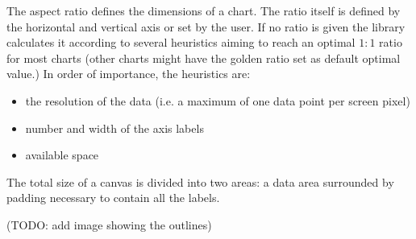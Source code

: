 The aspect ratio defines the dimensions of a chart. The ratio itself is defined by the horizontal and vertical axis or set by the user. If no ratio is given the library calculates it according to several heuristics aiming to reach an optimal $1:1$ ratio for most charts (other charts might have the golden ratio \cite{weisstein09, few04} set as default optimal value.) In order of importance, the heuristics are: 
\begin{itemize}
\item the resolution of the data (i.e. a maximum of one data point per screen pixel)
\item number and width of the axis labels
\item available space
\end{itemize}
The total size of a canvas is divided into two areas: a data area surrounded by padding necessary to contain all the labels.

(TODO: add image showing the outlines)
